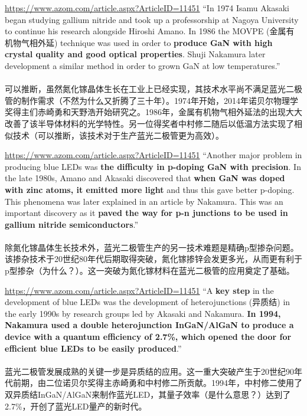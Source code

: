 \begin{slide}{\url{https://www.azom.com/article.aspx?ArticleID=11451}}
  ``In 1974 Isamu Akasaki began studying gallium nitride and took up a professorship at Nagoya University to continue his research alongside Hiroshi Amano. In 1986 the MOVPE (金属有机物气相外延) technique was used in order to \textbf{produce GaN with high crystal quality and good optical properties}. Shuji Nakamura later development a similar method in order to grown GaN at low temperatures.''
  \\~\\
  可以推断，虽然氮化镓晶体生长在工业上已经实现，其技术水平尚不满足蓝光二极管的制作需求（不然为什么又折腾了三十年）。1974年开始，2014年诺贝尔物理学奖得主们赤崎勇和天野浩开始研究之。1986年，金属有机物气相外延法的出现大大改善了该半导体材料的光学特性。另一位得奖者中村修二随后以低温方法实现了相似技术（可以推断，该技术对于生产蓝光二极管更为高效）。
\end{slide}

\begin{slide}{\url{https://www.azom.com/article.aspx?ArticleID=11451}}
  ``Another major problem in producing blue LEDs was \textbf{the difficulty in p-doping GaN with precision}. In the late 1980s, Amano and Akasaki discovered that \textbf{when GaN was doped with zinc atoms, it emitted more light} and thus this gave better p-doping. This phenomena was later explained in an article by Nakamura. This was an important discovery as it \textbf{paved the way for p-n junctions to be used in gallium nitride semiconductors}.''
  \\~\\
  除氮化镓晶体生长技术外，蓝光二极管生产的另一技术难题是精确p型掺杂问题。该掺杂技术于20世纪80年代后期取得突破，氮化镓掺锌会发更多光，从而更有利于p型掺杂（为什么？）。这一突破为氮化镓材料在蓝光二极管的应用奠定了基础。
\end{slide}

\begin{slide}{\url{https://www.azom.com/article.aspx?ArticleID=11451}}
  ``A \textbf{key step} in the development of blue LEDs was the development of heterojunctions (异质结) in the early 1990s by research groups led by Akasaki and Nakamura.  \textbf{In 1994, Nakamura used a double heterojunction InGaN/AlGaN to produce a device with a quantum efficiency of 2.7\%, which opened the door for efficient blue LEDs to be easily produced}.''
  \\~\\
  蓝光二极管发展成熟的关键一步是异质结的应用。这一重大突破产生于20世纪90年代前期，由二位诺贝尔奖得主赤崎勇和中村修二所贡献。1994年，中村修二使用了双异质结InGaN/AlGaN来制作蓝光LED，其量子效率（是什么意思？）达到了2.7\%，开创了蓝光LED量产的新时代。
\end{slide}

